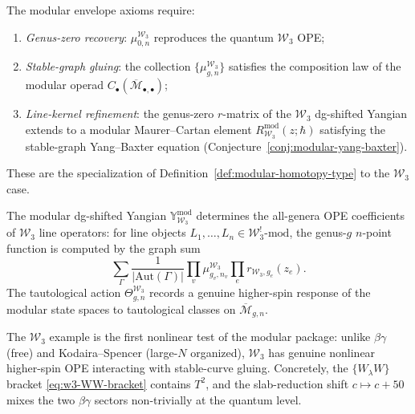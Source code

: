 \begin{remark}
\label{rem:w3-modular-envelope-axioms}
The modular envelope axioms require:
\begin{enumerate}[label=\textup{(\alph*)}]
\item \emph{Genus-zero recovery}: $\mu_{0,n}^{\mathcal{W}_3}$ reproduces the
  quantum $\mathcal{W}_3$ OPE;
\item \emph{Stable-graph gluing}: the collection
  $\{\mu_{g,n}^{\mathcal{W}_3}\}$ satisfies the composition law of the
  modular operad
  $C_\bullet(\overline{\mathcal{M}}_{\bullet,\bullet})$;
\item \emph{Line-kernel refinement}: the genus-zero $r$-matrix of the
  $\mathcal{W}_3$ dg-shifted Yangian extends to a modular
  Maurer--Cartan element
  $R_{\mathcal{W}_3}^{\mathrm{mod}}(z;\hbar)$ satisfying the
  stable-graph Yang--Baxter equation
  (Conjecture~\ref{conj:modular-yang-baxter}).
\end{enumerate}
These are the specialization of
Definition~\ref{def:modular-homotopy-type} to the $\mathcal{W}_3$
case.
\end{remark}

\begin{conjecture}
\label{conj:w3-higher-spin-modular}
The modular dg-shifted Yangian
$\mathbb{Y}_{\mathcal{W}_3}^{\mathrm{mod}}$ determines the all-genera
OPE coefficients of $\mathcal{W}_3$ line operators: for line objects
$L_1, \ldots, L_n \in \mathcal{W}_3^{!}\text{-mod}$, the genus-$g$
$n$-point function is computed by the graph sum
\begin{equation}\label{eq:w3-graph-sum-ope}
\sum_{\Gamma}
  \frac{1}{|\mathrm{Aut}(\Gamma)|}
  \prod_{v} \mu_{g_v,n_v}^{\mathcal{W}_3}
  \prod_{e} r_{\mathcal{W}_3,g_e}(z_e).
\end{equation}
The tautological action
$\Theta_{g,n}^{\mathcal{W}_3}$ records a genuine higher-spin response
of the modular state spaces to tautological classes on
$\overline{\mathcal{M}}_{g,n}$.
\end{conjecture}

\begin{remark}
\label{rem:w3-nonlinear-test}
The $\mathcal{W}_3$ example is the first nonlinear test of the modular
package: unlike $\beta\gamma$ (free) and Kodaira--Spencer (large-$N$
organized), $\mathcal{W}_3$ has genuine nonlinear higher-spin OPE
interacting with stable-curve gluing.  Concretely, the $\{W_\lambda W\}$
bracket \eqref{eq:w3-WW-bracket} contains $T^2$, and the slab-reduction
shift $c \mapsto c + 50$ mixes the two $\beta\gamma$ sectors
non-trivially at the quantum level.
\end{remark}


